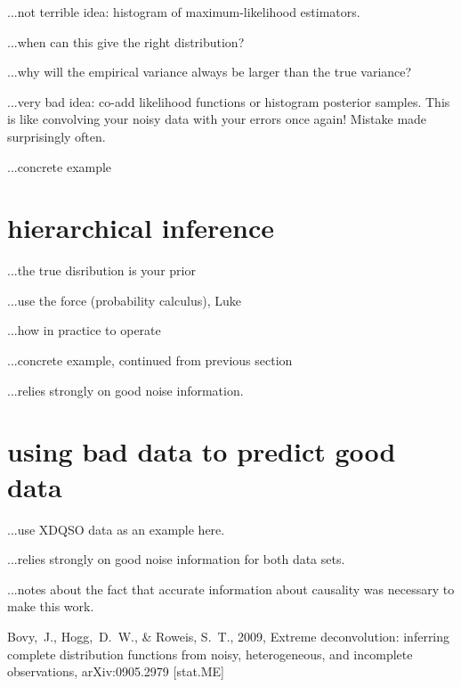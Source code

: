 \documentclass[12pt,twoside]{article}
\begin{document}
...not terrible idea: histogram of maximum-likelihood estimators.

...when can this give the right distribution?

...why will the empirical variance always be larger than the true variance?

...very bad idea: co-add likelihood functions or histogram posterior
samples.  This is like convolving your noisy data with your errors
once again!  Mistake made surprisingly often.

...concrete example

\section{hierarchical inference}

...the true disribution is your prior

...use the force (probability calculus), Luke

...how in practice to operate

...concrete example, continued from previous section

...relies strongly on good noise information.

\section{using bad data to predict good data}

...use XDQSO data as an example here.

...relies strongly on good noise information for both data sets.

...notes about the fact that accurate information about causality was
necessary to make this work.

\clearpage
{}\theendnotes

\clearpage
\begin{thebibliography}{}
  Bovy,~J., Hogg,~D.~W., \& Roweis, S.~T., 2009,
  Extreme deconvolution: inferring complete distribution functions from noisy, heterogeneous, and incomplete observations, 
  arXiv:0905.2979 [stat.ME]
\end{thebibliography}
\end{document}
